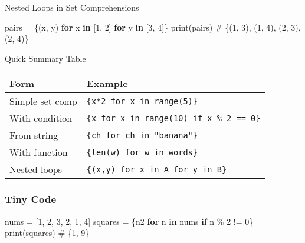 \documentclass[
  letterpaper,
  DIV=11,
  numbers=noendperiod]{scrreprt}
\newenvironment{Shaded}{\begin{snugshade}}{\end{snugshade}}
\newcommand{\BuiltInTok}[1]{\textcolor[rgb]{0.00,0.23,0.31}{#1}}
\newcommand{\CommentTok}[1]{\textcolor[rgb]{0.37,0.37,0.37}{#1}}
\newcommand{\ControlFlowTok}[1]{\textcolor[rgb]{0.00,0.23,0.31}{\textbf{#1}}}
\newcommand{\DecValTok}[1]{\textcolor[rgb]{0.68,0.00,0.00}{#1}}
\newcommand{\KeywordTok}[1]{\textcolor[rgb]{0.00,0.23,0.31}{\textbf{#1}}}
\newcommand{\NormalTok}[1]{\textcolor[rgb]{0.00,0.23,0.31}{#1}}
\newcommand{\OperatorTok}[1]{\textcolor[rgb]{0.37,0.37,0.37}{#1}}
\begin{document}
Nested Loops in Set Comprehensions

\begin{Shaded}
\begin{Highlighting}[]
\NormalTok{pairs }\OperatorTok{=}\NormalTok{ \{(x, y) }\ControlFlowTok{for}\NormalTok{ x }\KeywordTok{in}\NormalTok{ [}\DecValTok{1}\NormalTok{, }\DecValTok{2}\NormalTok{] }\ControlFlowTok{for}\NormalTok{ y }\KeywordTok{in}\NormalTok{ [}\DecValTok{3}\NormalTok{, }\DecValTok{4}\NormalTok{]\}}
\BuiltInTok{print}\NormalTok{(pairs)   }\CommentTok{\# \{(1, 3), (1, 4), (2, 3), (2, 4)\}}
\end{Highlighting}
\end{Shaded}

Quick Summary Table

\begin{longtable}[]{@{}ll@{}}
\toprule\noalign{}
Form & Example \\
\midrule\noalign{}
\endhead
\bottomrule\noalign{}
\endlastfoot
Simple set comp & \texttt{\{x*2\ for\ x\ in\ range(5)\}} \\
With condition &
\texttt{\{x\ for\ x\ in\ range(10)\ if\ x\ \%\ 2\ ==\ 0\}} \\
From string & \texttt{\{ch\ for\ ch\ in\ "banana"\}} \\
With function & \texttt{\{len(w)\ for\ w\ in\ words\}} \\
Nested loops & \texttt{\{(x,y)\ for\ x\ in\ A\ for\ y\ in\ B\}} \\
\end{longtable}

\subsubsection{Tiny Code}\label{tiny-code-82}

\begin{Shaded}
\begin{Highlighting}[]
\NormalTok{nums }\OperatorTok{=}\NormalTok{ [}\DecValTok{1}\NormalTok{, }\DecValTok{2}\NormalTok{, }\DecValTok{3}\NormalTok{, }\DecValTok{2}\NormalTok{, }\DecValTok{1}\NormalTok{, }\DecValTok{4}\NormalTok{]}
\NormalTok{squares }\OperatorTok{=}\NormalTok{ \{n2 }\ControlFlowTok{for}\NormalTok{ n }\KeywordTok{in}\NormalTok{ nums }\ControlFlowTok{if}\NormalTok{ n }\OperatorTok{\%} \DecValTok{2} \OperatorTok{!=} \DecValTok{0}\NormalTok{\}}
\BuiltInTok{print}\NormalTok{(squares)   }\CommentTok{\# \{1, 9\}}
\end{Highlighting}
\end{Shaded}
\end{document}
